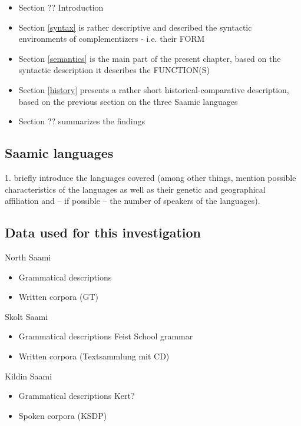\documentclass[a4,12pt]{scrartcl}
\begin{document}
\begin{itemize}
\item Section ?? Introduction
\item Section \ref{syntax} is rather descriptive and described the syntactic environments of complementizers - i.e. their FORM
\item Section \ref{semantics} is the main part of the present chapter, based on the syntactic description it describes the FUNCTION(S)
\item Section \ref{history} presents a rather short historical-comparative description, based on the previous section on the three Saamic languages
\item Section ?? summarizes the findings
\end{itemize}


\subsection{Saamic languages}

1.	briefly introduce the languages covered (among other things, mention possible characteristics of the languages as well as their genetic and geographical affiliation and – if possible – the number of speakers of the languages).

\begin{center}
\setlength\fboxsep{0pt}%
\setlength\fboxrule{0.5pt}%
\end{center}

\subsection{Data used for this investigation}
North Saami
\begin{itemize}
\item Grammatical descriptions
\item Written corpora (GT)
\end{itemize}

Skolt Saami
\begin{itemize}
\item Grammatical descriptions
	\subitem Feist
	\subitem School grammar
\item Written corpora (Textsammlung mit CD)
\end{itemize}

Kildin Saami
\begin{itemize}
\item Grammatical descriptions
	\subitem Kert?
\item Spoken corpora (KSDP)
\end{itemize}
\end{document}
